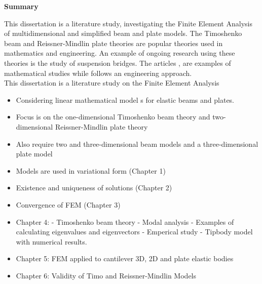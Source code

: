 \documentclass[main.tex]{subfiles}
\begin{document}
\begin{center}
	\large \textbf{Summary}
\end{center}
This dissertation is a literature study, investigating the Finite Element Analysis of multidimensional and simplified beam and plate models. The Timoshenko beam and Reissner-Mindlin plate theories are popular theories used in mathematics and engineering. An example of ongoing research using these theories is the study of suspension bridges. The articles \cite{Mck99}, \cite{BOC20} are examples of mathematical studies while \cite{SV86} follows an engineering approach.\\


 This dissertation is a literature study on the Finite Element Analysis 
 \begin{itemize}
	\item Considering linear mathematical model s for elastic beams and plates.
	\item Focus is on the one-dimensional Timoshenko beam theory and two-dimensional Reissner-Mindlin plate theory
	\item Also require two and three-dimensional beam models and a three-dimensional plate model
	\item Models are used in variational form (Chapter 1)
	\item Existence and uniqueness of solutions (Chapter 2)
	\item Convergence of FEM (Chapter 3)
	\item Chapter 4: - Timoshenko beam theory - Modal analysis - Examples of calculating eigenvalues and eigenvectors - Emperical study - Tipbody model with numerical results.
	\item Chapter 5: FEM applied to cantilever 3D, 2D and plate elastic bodies
	\item Chapter 6: Validity of Timo and Reissner-Mindlin Models
\end{itemize}
\end{document}
